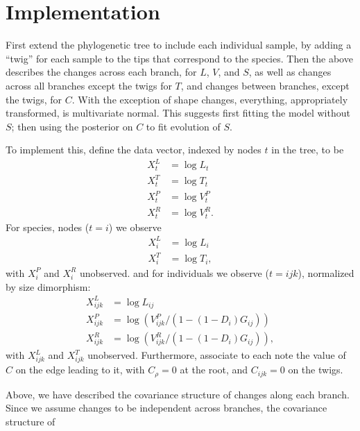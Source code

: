 \documentclass{article}
\begin{document}
\section{Implementation}

First extend the phylogenetic tree to include each individual sample, by adding a ``twig'' for each sample
to the tips that correspond to the species.
Then the above describes the changes across each branch, 
for $L$, $V$, and $S$,
as well as changes across all branches except the twigs for $T$,
and changes between branches, except the twigs, for $C$.
With the exception of shape changes, everything, appropriately transformed, 
is multivariate normal.
This suggests first fitting the model without $S$;
then using the posterior on $C$ to fit evolution of $S$.

To implement this, define the data vector, indexed by nodes $t$ in the tree, to be
\begin{align}
    X^L_t &= \log L_t \\
    X^T_t &= \log T_t \\
    X^P_t &= \log V^P_t \\
    X^R_t &= \log V^R_t .
\end{align}
For species, nodes ($t=i$) we observe
\begin{align}
    X^L_i &= \log L_i \\
    X^T_i &= \log T_i ,
\end{align}
with $X^P_i$ and $X^R_i$ unobserved.
and for individuals we observe ($t={ijk}$), normalized by size dimorphism:
\begin{align}
    X^L_{ijk} &= \log L_{ij} \\
    X^P_{ijk} &= \log ( V^P_{ijk} / (1-(1-D_i)G_{ij}) ) \\
    X^R_{ijk} &= \log ( V^R_{ijk} / (1-(1-D_i)G_{ij}) ) ,
\end{align}
with $X^L_{ijk}$ and $X^T_{ijk}$ unobserved.
Furthermore, associate to each note the value of $C$ on the edge leading to it,
with $C_\rho=0$ at the root, and $C_{ijk}=0$ on the twigs.

Above, we have described the covariance structure of changes along each branch.
Since we assume changes to be independent across branches,
the covariance structure of 
\end{document}
